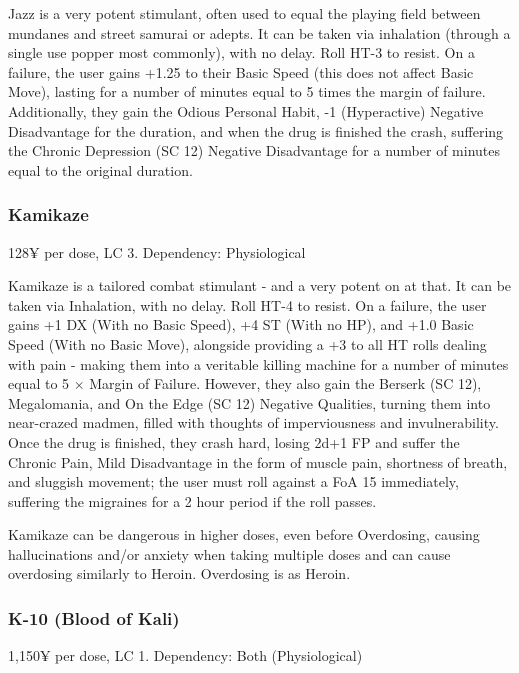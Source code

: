Jazz is a very potent stimulant, often used to equal the playing field between mundanes and street samurai or adepts. It can be taken via inhalation (through a single use popper most commonly), with no delay. Roll HT-3 to resist. On a failure, the user gains +1.25 to their Basic Speed (this does not affect Basic Move), lasting for a number of minutes equal to 5 times the margin of failure. Additionally, they gain the Odious Personal Habit, -1 (Hyperactive) Negative Disadvantage for the duration, and when the drug is finished the crash, suffering the Chronic Depression (SC 12) Negative Disadvantage for a number of minutes equal to the original duration.

\subsubsection{Kamikaze}
\begin{flushleft}
	128¥ per dose, LC 3. 
	Dependency: Physiological
\end{flushleft}

Kamikaze is a tailored combat stimulant - and a very potent on at that. It can be taken via Inhalation, with no delay. Roll HT-4 to resist. On a failure, the user gains +1 DX (With no Basic Speed), +4 ST (With no HP), and +1.0 Basic Speed (With no Basic Move), alongside providing a +3 to all HT rolls dealing with pain - making them into a veritable killing machine for a number of minutes equal to 5 $\times$ Margin of Failure. However, they also gain the Berserk (SC 12), Megalomania, and On the Edge (SC 12) Negative Qualities, turning them into near-crazed madmen, filled with thoughts of imperviousness and invulnerability. Once the drug is finished, they crash hard, losing 2d+1 FP and suffer the Chronic Pain, Mild Disadvantage in the form of muscle pain, shortness of breath, and sluggish movement; the user must roll against a FoA 15 immediately, suffering the migraines for a 2 hour period if the roll passes. 

Kamikaze can be dangerous in higher doses, even before Overdosing, causing hallucinations and/or anxiety when taking multiple doses and can cause overdosing similarly to Heroin. Overdosing is as Heroin.

\subsubsection{K-10 (Blood of Kali)}
\begin{flushleft}
	1,150¥ per dose, LC 1. 
	Dependency: Both (Physiological)
\end{flushleft}

